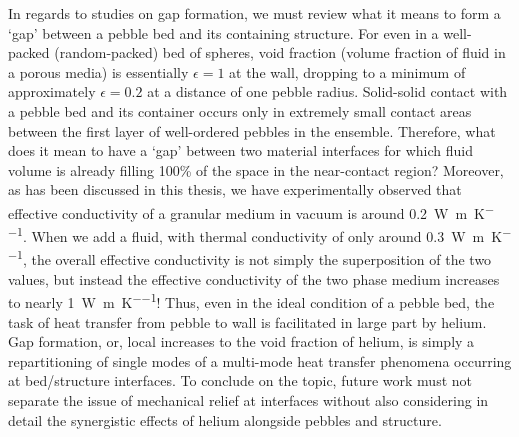In regards to studies on gap formation, we must review what it means to form a `gap' between a pebble bed and its containing structure. For even in a well-packed (random-packed) bed of spheres, void fraction (volume fraction of fluid in a porous media) is essentially $\epsilon = 1$ at the wall, dropping to a minimum of approximately $\epsilon = 0.2$ at a distance of one pebble radius. Solid-solid contact with a pebble bed and its container occurs only in extremely small contact areas between the first layer of well-ordered pebbles in the ensemble. Therefore, what does it mean to have a `gap' between two material interfaces for which fluid volume is already filling 100\% of the space in the near-contact region? Moreover, as has been discussed in this thesis, we have experimentally observed that effective conductivity of a granular medium in vacuum is around \SI{0.2}{\watt\per\meter\per\kelvin}. When we add a fluid, with thermal conductivity of only around \SI{0.3}{\watt\per\meter\per\kelvin}, the overall effective conductivity is not simply the superposition of the two values, but instead the effective conductivity of the two phase medium increases to nearly \SI{1}{\watt\per\meter\per\kelvin}! Thus, even in the ideal condition of a pebble bed, the task of heat transfer from pebble to wall is facilitated in large part by helium. Gap formation, or, local increases to the void fraction of helium, is simply a repartitioning of single modes of a multi-mode heat transfer phenomena occurring at bed/structure interfaces. To conclude on the topic, future work must not separate the issue of mechanical relief at interfaces without also considering in detail the synergistic effects of helium alongside pebbles and structure.

